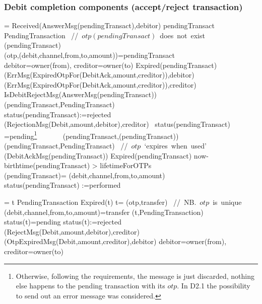 \subsubsection{Debit completion components (accept/reject transaction)}

\begin{asm}  =\+          
\IF Received(AnswerMsg(pendingTransact),\FROM debitor) \THEN\+
   \IF pendingTransact  \not \in PendingTransaction \THEN \mbox{  //  $otp(pendingTransact)$ does not exist}\+
		(pendingTransact)\\
      \ELSE \+
         \LET (otp,(debit,channel,from,to,amount))=pendingTransact \\
    \LET debitor=owner(from), creditor=owner(to)\+
            \IF Expired(pendingTransact) \THEN \+
     (ErrMsg(ExpiredOtpFor(DebitAck,amount,creditor)),\TO debitor) \\
     (ErrMsg(ExpiredOtpFor(DebitAck,amount,creditor)),\TO creditor)\-
     \ELSE ~\IF  
     IsDebitRejectMsg(AnswerMsg(pendingTransact)) \THEN \+
     (pendingTransact,PendingTransact)\\
     status(pendingTransact):=rejected\\
     (RejectionMsg(Debit,amount,debitor),\TO creditor)\-        
     \ELSE ~\IF status(pendingTransact)   =pending\footnote{Otherwise, following the requirements, the message is just discarded, nothing else happens to the pending transaction with its $otp$. In D2.1 the possibility to send out an error message was considered.} \THEN \+
     \+
     ~~~~~~ (pendingTransact,(pendingTransact))\-
     (pendingTransact,PendingTransact)
     \mbox{  // $otp$ `expires when used'}\dec\dec\dec\dec\- 
     (DebitAckMsg(pendingTransact)) \dec\-
     \WHERE \+
     Expired(pendingTransact) \IFF now-birthtime(pendingTransact) > lifetimeForOTPs\\
     (pendingTransact)=\+
     (debit,channel,from,to,amount)\\
     status(pendingTransact) :=performed\\
\end{asm}

 
\begin{asm} 
 =\+          
\IF t \in PendingTransaction \AND Expired(t)  \THEN  \+
          \LET t= (otp,transfer) \mbox{ // NB. $otp$ is unique}\\
          \LET (debit,channel,from,to,amount)=transfer \+
(t,PendingTransaction) \\
          \IF status(t)=pending \THEN \+
          status(t):=rejected\\
(RejectMsg(Debit,amount,debitor),\TO creditor)\\ 
(OtpExpiredMsg(Debit,amount,creditor),\TO debitor)  \dec\dec\dec \-
          \WHERE debitor=owner(from), creditor=owner(to)
\end{asm}
 
